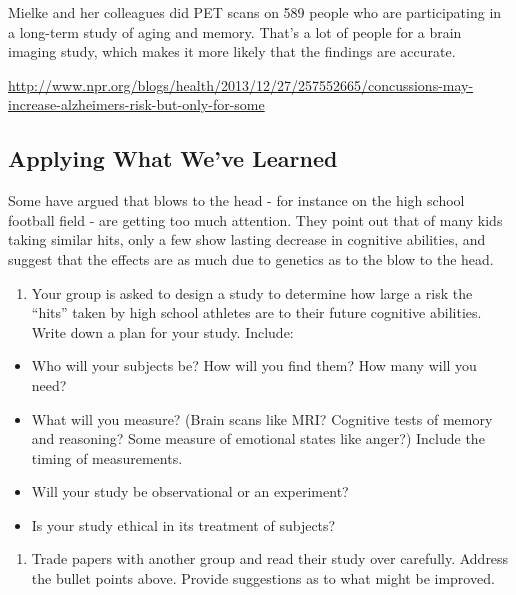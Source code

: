 \documentclass[
]{report}
\providecommand{\tightlist}{%
  \setlength{\itemsep}{0pt}\setlength{\parskip}{0pt}}
\begin{document}
Mielke and her colleagues did PET scans on 589 people who are participating in a long-term study of aging and memory. That's a lot of people for a brain imaging study, which makes it more likely that the findings are accurate.

\url{http://www.npr.org/blogs/health/2013/12/27/257552665/concussions-may-increase-alzheimers-risk-but-only-for-some}

\hypertarget{applying-what-weve-learned}{%
\subsection*{Applying What We've Learned}\label{applying-what-weve-learned}}

Some have argued that blows to the head - for instance on the high school football field - are getting too much attention. They point out that of many kids taking similar hits, only a few show lasting decrease in cognitive abilities, and suggest that the effects are as much due to genetics as to the blow to the head.

\begin{enumerate}
\def\labelenumi{\arabic{enumi}.}
\tightlist
\item
  Your group is asked to design a study to determine how large a risk the ``hits''
  taken by high school athletes are to their future cognitive abilities. Write down
  a plan for your study. Include:
\end{enumerate}

\begin{itemize}
\item
  Who will your subjects be? How will you find them? How many will you need?
\item
  What will you measure? (Brain scans like MRI? Cognitive tests of memory and reasoning? Some measure of emotional states like anger?) Include the timing of measurements.
\item
  Will your study be observational or an experiment?
\item
  Is your study ethical in its treatment of subjects?
\end{itemize}

\vspace{1in}

\begin{enumerate}
\def\labelenumi{\arabic{enumi}.}
\setcounter{enumi}{1}
\tightlist
\item
  Trade papers with another group and read their study over carefully. Address the bullet points above. Provide suggestions as to what might be improved.
\end{enumerate}
\end{document}
